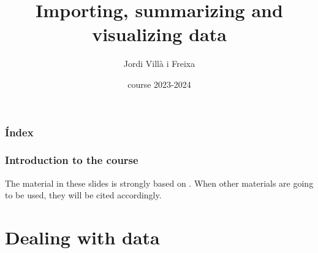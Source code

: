 \documentclass{beamer}
\title[Introduction]{Importing, summarizing and visualizing data} %
\author{Jordi Villà i Freixa} %
\institute[FCTE] %
{
Universitat de Vic - Universitat Central de Catalunya \\
Study Abroad\\ %
\medskip
\textit{jordi.villa@uvic.cat} %
}
\date{course 2023-2024}
\begin{document}
\begin{frame}
\titlepage %
\end{frame}

\begin{frame}
\frametitle{Índex} %
\tableofcontents %
\end{frame}


\begin{frame}
  \frametitle{Introduction to the course}
  The material in these slides is strongly based on \cite{kroese2020}. When other materials are going to be used, they will be cited accordingly.
  \end{frame}

\section{Dealing with data} %

\end{document}
